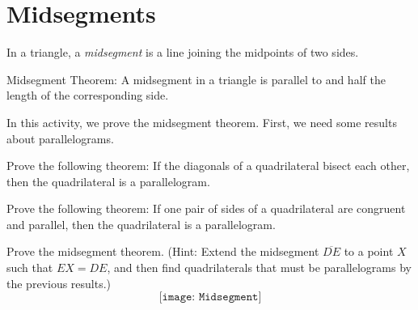 \newpage

\section{Midsegments}
\begin{definition}
In a triangle, a \emph{midsegment} is a line joining the midpoints of two sides.  
\end{definition}

\begin{theorem}
Midsegment Theorem:  A midsegment in a triangle is parallel to and half the length of the corresponding side.
\end{theorem}

In this activity, we prove the midsegment theorem.  First, we need some results about parallelograms. 

\begin{prob}
Prove the following theorem:  If the diagonals of a quadrilateral bisect each other, then the quadrilateral is a parallelogram. 
\end{prob}

\begin{prob}
Prove the following theorem:  If one pair of sides of a quadrilateral are congruent and parallel, then the quadrilateral is a parallelogram. 
\end{prob}

\begin{prob}
Prove the midsegment theorem.  (Hint:  Extend the midsegment $\overline{DE}$ to a point $X$ such that $EX=DE$, and then find quadrilaterals that must be parallelograms by the previous results.)  
$$\texttt{[image: Midsegment]}$$
\end{prob}




